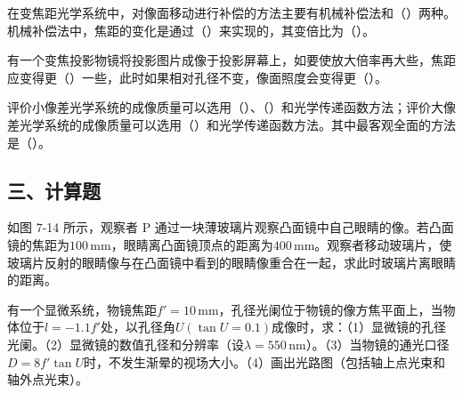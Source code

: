 \documentclass[padl, analysis, notocnum]{ExBook}
\newcommand{\answerarea}[1][3.5cm]{%
  \par\vspace{1mm}%
  \noindent{\color{themeColor!35}\rule{\linewidth}{0.4pt}}\par
  \noindent\begin{minipage}[t][#1][t]{\linewidth}\vspace{0pt}\end{minipage}\par
  \noindent{\color{themeColor!35}\rule{\linewidth}{0.4pt}}\par
}
\begin{document}
\begin{qitems}[startnum=14]
\qitem 在变焦距光学系统中，对像面移动进行补偿的方法主要有机械补偿法和（\hspace{1.6em}）两种。机械补偿法中，焦距的变化是通过（\hspace{1.6em}）来实现的，其变倍比为（\hspace{1.6em}）。
\label{q:160:start}
\answerarea[4.0cm]
\label{q:160:end}
\end{qitems}

\begin{qitems}[startnum=15]
\qitem 有一个变焦投影物镜将投影图片成像于投影屏幕上，如要使放大倍率再大些，焦距应变得更（\hspace{1.6em}）一些，此时如果相对孔径不变，像面照度会变得更（\hspace{1.6em}）。
\label{q:161:start}
\answerarea[4.0cm]
\label{q:161:end}
\end{qitems}

\begin{qitems}[startnum=16]
\qitem 评价小像差光学系统的成像质量可以选用（\hspace{1.6em}）、（\hspace{1.6em}）和光学传递函数方法；评价大像差光学系统的成像质量可以选用（\hspace{1.6em}）和光学传递函数方法。其中最客观全面的方法是（\hspace{1.6em}）。
\label{q:162:start}
\answerarea[4.0cm]
\label{q:162:end}
\end{qitems}

\subsection{三、计算题}
\begin{qitems}[startnum=1]
\qitem 如图 7-14 所示，观察者 P 通过一块薄玻璃片观察凸面镜中自己眼睛的像。若凸面镜的焦距为$100\,\mathrm{mm}$，眼睛离凸面镜顶点的距离为$400\,\mathrm{mm}$。观察者移动玻璃片，使玻璃片反射的眼睛像与在凸面镜中看到的眼睛像重合在一起，求此时玻璃片离眼睛的距离。
\label{q:163:start}
\answerarea[2.4cm]
\label{q:163:end}
\end{qitems}

\begin{qitems}[startnum=2]
\qitem 有一个显微系统，物镜焦距$f'=10\,\mathrm{mm}$，孔径光阑位于物镜的像方焦平面上，当物体位于$l=-1.1f'$处，以孔径角$U(\tan U=0.1)$成像时，求：（1）显微镜的孔径光阑。（2）显微镜的数值孔径和分辨率（设$\lambda =550\,\mathrm{nm}$）。（3）当物镜的通光口径$D=8f'\tan U$时，不发生渐晕的视场大小。（4）画出光路图（包括轴上点光束和轴外点光束）。
\label{q:164:start}
\answerarea[7.0cm]
\label{q:164:end}
\end{qitems}
\end{document}
